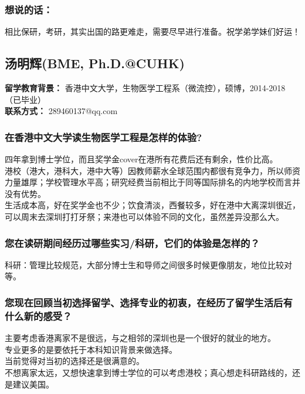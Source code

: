 \documentclass[a4paper,UTF8]{book}
\begin{document}
    \subsubsection{想说的话：}
    相比保研，考研，其实出国的路更难走，需要尽早进行准备。祝学弟学妹们好运！

        
        

   


\clearpage
\subsection{汤明辉(BME, Ph.D.@CUHK)}
    \textbf{留学教育背景：} 香港中文大学，生物医学工程系（微流控），硕博，2014-2018（已毕业）\\
    \textbf{联系方式：} 289460137@qq.com

    \subsubsection*{在香港中文大学读生物医学工程是怎样的体验?}
    四年拿到博士学位，而且奖学金cover在港所有花费后还有剩余，性价比高。\\
    港校（港大，港科大，港中大等）因教师薪水全球范围内都很有竞争力，所以师资力量雄厚；学校管理水平高；研究经费当前相比于同等国际排名的内地学校而言并没有优势。\\
    生活成本高，好在奖学金也不少；饮食清淡，西餐较多，好在港中大离深圳很近，可以周末去深圳打打牙祭；来港也可以体验不同的文化，虽然差异没那么大。

    \subsubsection*{您在读研期间经历过哪些实习/科研，它们的体验是怎样的？}
    科研：管理比较规范，大部分博士生和导师之间很多时候更像朋友，地位比较对等。
    
    \subsubsection*{您现在回顾当初选择留学、选择专业的初衷，在经历了留学生活后有什么新的感受？}
    主要考虑香港离家不是很远，与之相邻的深圳也是一个很好的就业的地方。\\
    专业更多的是要依托于本科知识背景来做选择。\\
    当前觉得对当初的选择还是很满意的。\\
    不想离家太远，又想快速拿到博士学位的可以考虑港校；真心想走科研路线的，还是建议美国。
\end{document}
